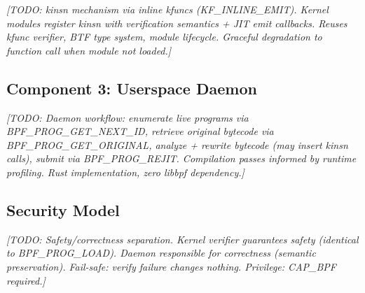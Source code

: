 \textit{[TODO: kinsn mechanism via inline kfuncs (KF\_INLINE\_EMIT).
Kernel modules register kinsn with verification semantics + JIT emit
callbacks. Reuses kfunc verifier, BTF type system, module lifecycle.
Graceful degradation to function call when module not loaded.]}

\subsection{Component 3: Userspace Daemon}
\label{sec:daemon}

\textit{[TODO: Daemon workflow: enumerate live programs via
BPF\_PROG\_GET\_NEXT\_ID, retrieve original bytecode via
BPF\_PROG\_GET\_ORIGINAL, analyze + rewrite bytecode (may insert kinsn
calls), submit via BPF\_PROG\_REJIT. Compilation passes informed by
runtime profiling. Rust implementation, zero libbpf dependency.]}

\subsection{Security Model}
\label{sec:security}

\textit{[TODO: Safety/correctness separation. Kernel verifier guarantees
safety (identical to BPF\_PROG\_LOAD). Daemon responsible for
correctness (semantic preservation). Fail-safe: verify failure changes
nothing. Privilege: CAP\_BPF required.]}
